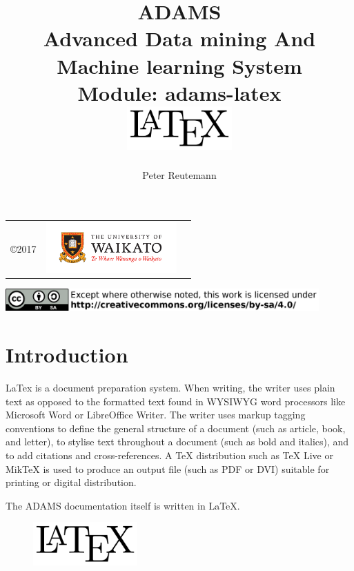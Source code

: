 \documentclass[a4paper]{book}
\title{
  \textbf{ADAMS} \\
  {\Large \textbf{A}dvanced \textbf{D}ata mining \textbf{A}nd \textbf{M}achine
  learning \textbf{S}ystem} \\
  {\Large Module: adams-latex} \\
  \vspace{1cm}
  \includegraphics[width=4cm]{images/latex.png} \\
}
\author{
  Peter Reutemann
}
\begin{document}
\begin{titlepage}
\maketitle

\thispagestyle{empty}
\center
\begin{table}[b]
	\begin{tabular}{c l l}
		\parbox[c][2cm]{2cm}{\copyright 2017} &
		\parbox[c][2cm]{5cm}{\includegraphics[width=5cm]{images/coat_of_arms.pdf}} \\
	\end{tabular}
	\includegraphics[width=12cm]{images/cc.png} \\
\end{table}

\end{titlepage}

\tableofcontents
\listoffigures

\chapter{Introduction}
LaTex\cite{latex} is a document preparation system. When writing, the writer
uses plain text as opposed to the formatted text found in WYSIWYG word
processors like Microsoft Word or LibreOffice Writer. The writer uses markup
tagging conventions to define the general structure of a document (such as
article, book, and letter), to stylise text throughout a document (such as
bold and italics), and to add citations and cross-references. A TeX
distribution such as TeX Live or MikTeX is used to produce an output file
(such as PDF or DVI) suitable for printing or digital distribution.

The ADAMS documentation itself is written in LaTeX.

\begin{figure}[htb]
  \centering
  \includegraphics[width=4.0cm]{images/latex.png}
\end{figure}
\end{document}

